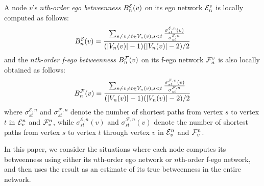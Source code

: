 A node $v$'s \emph{$n$th-order ego betweenness} $\BE{n}{v}$ on its ego network $\ENN{n}{v}$ is locally computed as follows:\begin{equation}\label{ebet}
\BE{n}{v} = \frac{\sum_{s \neq v \neq t \in \V{v}{n}, s<t}\frac{\sigma_{st}^{\mathcal{E}, n}(v)}{\sigma_{st}^{\mathcal{E}, n}}}{(|\V{v}{n}|-1)(|\V{v}{n}|-2)/2} 
\end{equation} and the \emph{$n$th-order f-ego betweenness} $\BF{n}{v}$ on its f-ego network $\FNN{n}{v}$ is also locally obtained as follows: \begin{equation}\label{eebet}
\BF{n}{v} = \frac{\sum_{s \neq v \neq t \in \V{v}{n}, s<t}\frac{\sigma_{st}^{\mathcal{F}, n}(v)}{\sigma_{st}^{\mathcal{F}, n}}}{(|\V{v}{n}|-1)(|\V{v}{n}|-2)/2}
\end{equation} where $\sigma_{st}^{\mathcal{E}, n}$ and $\sigma_{st}^{\mathcal{F}, n}$ denote the number of shortest paths from vertex $s$ to vertex $t$ in $\ENN{v}{n}$ and $\FNN{v}{n}$, while $\sigma_{st}^{\mathcal{E}, n}(v)$ and $\sigma_{st}^{\mathcal{F}, n}(v)$ denote the number of shortest paths from vertex $s$ to vertex $t$ through vertex $v$ in $\ENN{v}{n}$ and $\FNN{v}{n}$. 

In this paper, we consider the situations where each node computes its betweenness using either its $n$th-order ego network or $n$th-order f-ego network, and then uses the result as an estimate of its true betweenness in the entire network.



